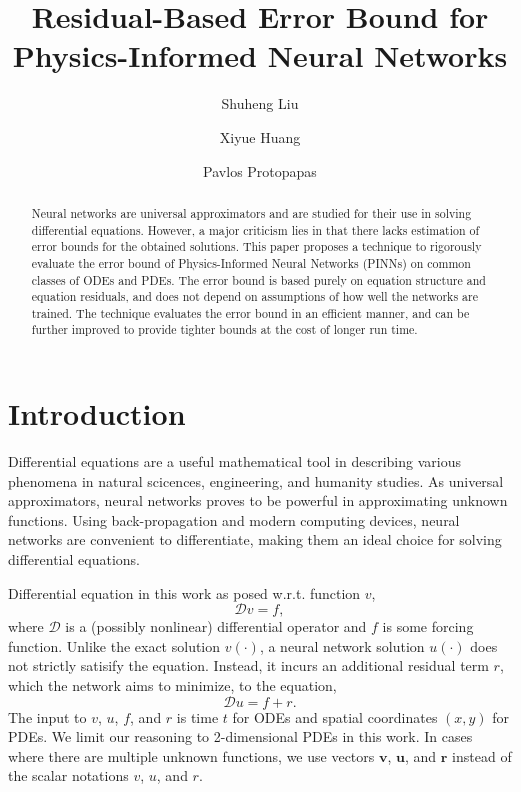 \documentclass[accepted]{uai2023}
\title{Residual-Based Error Bound for Physics-Informed Neural Networks}
\author[1]{Shuheng Liu}
\author[2]{Xiyue Huang}
\author[3]{Pavlos Protopapas}
\affil[1, 3]{
    Institute for Applied Computational Science\\
    Harvard University\\
    Cambridge, Massachusetts, USA
}
\affil[2]{
    Data Science Institute \\
    Columbia Data\\
    New York, New York, USA
}
\newcommand{\vect}[1]{\mathbf{#1}}
\begin{document}
\maketitle

\begin{abstract}
    Neural networks are universal approximators and are studied for their use in solving differential equations.
    However, a major criticism lies in that there lacks estimation of error bounds for the obtained solutions.
    This paper proposes a technique to rigorously evaluate the error bound of Physics-Informed Neural Networks (PINNs) on common classes of ODEs and PDEs.
    The error bound is based purely on equation structure and equation residuals, and does not depend on assumptions of how well the networks are trained.
    The technique evaluates the error bound in an efficient manner, and can be further improved to provide tighter bounds at the cost of longer run time.
\end{abstract}

\section{Introduction}
    Differential equations are a useful mathematical tool in describing various phenomena in natural scicences, engineering, and humanity studies. 
    As universal approximators, neural networks proves to be powerful in approximating unknown functions. 
    Using back-propagation and modern computing devices, neural networks are convenient to differentiate, making them an ideal choice for solving differential equations.

    Differential equation in this work as posed w.r.t. function $v$,
    {
        \small
        \begin{equation*}
            \mathcal{D} v = f,
        \end{equation*}
    }
    where $\mathcal{D}$ is a (possibly nonlinear) differential operator and $f$ is some forcing function.
    Unlike the exact solution $v(\cdot)$, a neural network solution $u(\cdot)$ does not strictly satisify the equation.
    Instead, it incurs an additional residual term $r$, which the network aims to minimize, to the equation, 
    {
        \small
        \begin{equation*}
            \mathcal{D} u = f + r.
        \end{equation*}
    }
    The input to $v$, $u$, $f$, and $r$ is time $t$ for ODEs and spatial coordinates $(x, y)$ for PDEs.
    We limit our reasoning to 2-dimensional PDEs in this work.
    In cases where there are multiple unknown functions, we use vectors $\vect{v}$, $\vect{u}$, and $\vect{r}$ instead of the scalar notations $v$, $u$, and $r$.
\end{document}
